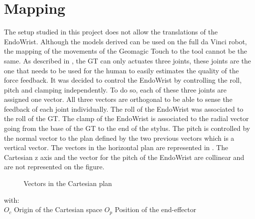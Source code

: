 \section{Mapping}

The setup studied in this project does not allow the translations of the EndoWrist. Although the models derived can be used on the full da Vinci robot, the mapping of the movements of the Geomagic Touch to the tool cannot be the same. As described in , the GT can only actuates three joints, these joints are the one that needs to be used for the human to easily estimates the quality of the force feedback. It was decided to control the EndoWrist by controlling the roll, pitch and clamping independently. To do so, each of these three joints are assigned one vector. All three vectors are orthogonal to be able to sense the feedback of each joint individually.
The roll of the EndoWrist was associated to the roll of the GT. The clamp of the EndoWrist is associated to the radial vector going from the base of the GT to the end of the stylus. The pitch is controlled by the normal vector to the plan defined by the two previous vectors which is a vertical vector. The vectors in the horizontal plan are represented in . The Cartesian z axis and the vector for the pitch of the EndoWrist are collinear and are not represented on the figure.
\\

\begin{figure}[H]
\centering
{}
\label{fig:cartesian_polar}
\caption{Vectors in the Cartesian plan}
\end{figure}
with:\\
	\hspace*{8mm} $O_c$ Origin of the Cartesian space
	\space*{8mm} $O_p$ Position of the end-effector


